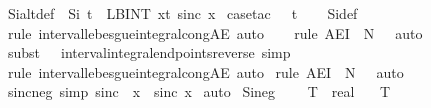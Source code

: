 \documentclass{article}
\theoremstyle{definition}
\begin{document}
\begin{isabellebody}
\isanewline
\isanewline
\isanewline
{}\isamarkupfalse%
\ Si{\isacharunderscore}alt{\isacharunderscore}def\ {\isacharcolon}\ {\isachardoublequoteopen}Si\ t\ {\isacharequal}\ LBINT\ x{\isacharequal}{}{\isachardot}{\isachardot}t{\isachardot}\ sinc\ x{\isachardoublequoteclose}\isanewline
{}\isamarkupfalse%
\ {\isacharparenleft}case{\isacharunderscore}tac\ {\isachardoublequoteopen}{}\ {\isasymle}\ t{\isachardoublequoteclose}{\isacharparenright}\isanewline
\ \ \isamarkupfalse%
\ Si{\isacharunderscore}def\ \isamarkupfalse%
\ {\isacharparenleft}rule\ interval{\isacharunderscore}lebesgue{\isacharunderscore}integral{\isacharunderscore}cong{\isacharunderscore}AE{\isacharcomma}\ auto{\isacharparenright}\isanewline
\ \ \isamarkupfalse%
\ {\isacharparenleft}rule\ AE{\isacharunderscore}I{\isacharprime}\ {\isacharbrackleft}\ N\ {\isacharequal}\ {\isachardoublequoteopen}{\isacharbraceleft}{}{\isacharbraceright}{\isachardoublequoteclose}{\isacharbrackright}{\isacharcomma}\ auto{\isacharparenright}\isanewline
\ \ \isamarkupfalse%
\ {\isacharparenleft}subst\ {\isacharparenleft}{}\ {}{\isacharparenright}\ interval{\isacharunderscore}integral{\isacharunderscore}endpoints{\isacharunderscore}reverse{\isacharcomma}\ simp{\isacharparenright}\isanewline
\ \ \isamarkupfalse%
\ {\isacharparenleft}rule\ interval{\isacharunderscore}lebesgue{\isacharunderscore}integral{\isacharunderscore}cong{\isacharunderscore}AE{\isacharcomma}\ auto{\isacharparenright}\isanewline
{}\isamarkupfalse%
\ {\isacharparenleft}rule\ AE{\isacharunderscore}I{\isacharprime}\ {\isacharbrackleft}\ N\ {\isacharequal}\ {\isachardoublequoteopen}{\isacharbraceleft}{}{\isacharbraceright}{\isachardoublequoteclose}{\isacharbrackright}{\isacharcomma}\ auto{\isacharparenright}%
\isanewline
{}\isamarkupfalse%
\ sinc{\isacharunderscore}neg\ {\isacharbrackleft}simp{\isacharbrackright}{\isacharcolon}\ {\isachardoublequoteopen}sinc\ {\isacharparenleft}{\isacharminus}\ x{\isacharparenright}\ {\isacharequal}\ sinc\ x{\isachardoublequoteclose}%
\isamarkupfalse%
\ auto%
\isanewline
\isanewline
{}\isamarkupfalse%
\ Si{\isacharunderscore}neg{\isacharcolon}\ \isanewline
\ \ \ T\ {\isacharcolon}{\isacharcolon}\ real\isanewline
\ \ \ {\isachardoublequoteopen}T\ {\isasymge}\ {}{\isachardoublequoteclose}\isanewline

\end{isabellebody}
\end{document}
